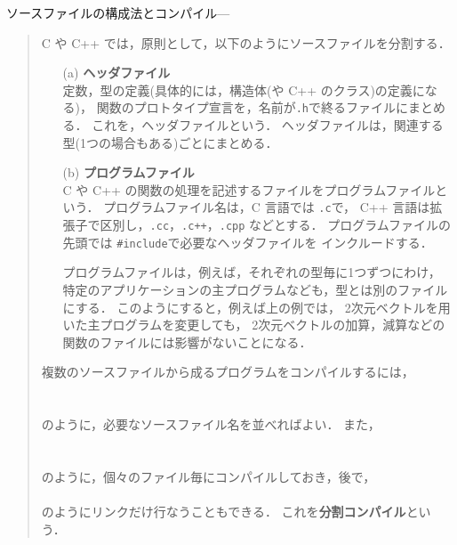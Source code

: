 \documentclass[11pt,a4,epsf]{jarticle}
\begin{document}
ソースファイルの構成法とコンパイル\leaders\hbox{---}\hfill\kern0pt %
\begin{quote}

C や C++ では，原則として，以下のようにソースファイルを分割する．

\begin{enumerate}

 \item[(a)] {\bf ヘッダファイル}	\\
定数，型の定義(具体的には，構造体(や C++ のクラス)の定義になる)，
関数のプロトタイプ宣言を，名前が\verb+.h+で終るファイルにまとめる．
これを，ヘッダファイルという．
ヘッダファイルは，関連する型(1つの場合もある)ごとにまとめる．

 \item[(b)] {\bf プログラムファイル}	\\
C や C++ の関数の処理を記述するファイルをプログラムファイルという．
プログラムファイル名は，C 言語では \verb+.c+で，
C++ 言語は拡張子で区別し，\verb+.cc+，\verb|.c++|，\verb+.cpp+ などとする．
プログラムファイルの先頭では {\tt \#include}で必要なヘッダファイルを
インクルードする．

プログラムファイルは，例えば，それぞれの型毎に1つずつにわけ，
特定のアプリケーションの主プログラムなども，型とは別のファイルにする．
このようにすると，例えば上の例では，
2次元ベクトルを用いた主プログラムを変更しても，
2次元ベクトルの加算，減算などの関数のファイルには影響がないことになる．

\end{enumerate}

複数のソースファイルから成るプログラムをコンパイルするには，	\\
\hspace*{10mm}{\tt \% cc vector2c.c vec2ex1c.c}	\\
\hspace*{10mm}{\tt \% c++ vector2p.cpp vec2ex1p.cpp}	\\
のように，必要なソースファイル名を並べればよい．
また，\\
\hspace*{10mm}{\tt \% cc -c vector2c.c}	\\
\hspace*{10mm}{\tt \% cc -c vec2ex1c.c}	\\
のように，個々のファイル毎にコンパイルしておき，後で，	\\
\hspace*{10mm}{\tt \% cc vector2c.o vec2ex1c.o}	\\
のようにリンクだけ行なうこともできる．
これを{\bf 分割コンパイル}という．
\end{quote}
\hrulefill
\end{document}
